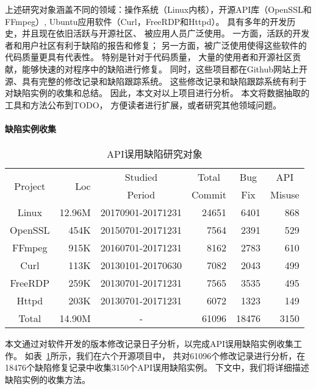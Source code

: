 上述研究对象涵盖不同的领域：操作系统（Linux内核），开源API库（OpenSSL和FFmpeg）,
Ubuntu应用软件（Curl，FreeRDP和Httpd）。
具有多年的开发历史，并且现在依旧活跃与开源社区、
被应用人员广泛使用。
一方面，活跃的开发者和用户社区有利于缺陷的报告和修复；
另一方面，被广泛使用使得这些软件的代码质量更具有代表性。
特别是针对于代码质量，
大量的使用者和开源社区贡献，能够快速的对程序中的缺陷进行修复。
同时，这些项目都在Github网站上开源、具有完整的修改记录和缺陷跟踪系统。
这些修改记录和缺陷跟踪系统有利于对缺陷实例的收集和总结。
因此，本文对以上项目进行分析。
本文将数据抽取的工具和方法公布到TODO，
方便读者进行扩展，或者研究其他领域问题。

\paragraph{缺陷实例收集}
\begin{table}[t]
	\centering
	\begin{minipage}[t]{0.9\linewidth} %
		\caption{API误用缺陷研究对象}
		\label{tab:2-3-statistics}
			\begin{tabular}{crcrrr}
			\hline
			\multirow{2}{*}{Project} & \multirow{2}{*}{Loc} & Studied & \multicolumn{1}{c}{Total}& \multicolumn{1}{c}{Bug}& \multicolumn{1}{c}{API}\\
			&  & Period & \multicolumn{1}{c}{Commit} & \multicolumn{1}{c}{Fix}& \multicolumn{1}{c}{Misuse} \\
			\hline
			Linux & 12.96M & 20170901-20171231 & 24651 & 6401 & 868 \\
			OpenSSL & 454K & 20150701-20171231 & 7564 & 2391 & 529 \\
			FFmpeg & 915K & 20160701-20171231 & 8162 & 2783 & 610 \\
			Curl & 113K & 20130101-20170630 & 7082 & 2043 & 499 \\
			FreeRDP & 259K & 20130701-20171231 & 7565 & 3535 & 495 \\
			Httpd & 203K & 20130701-20171231 & 6072 & 1323 & 149 \\
			\hline
			Total & 14.90M & - & 61096& 18476 & 3150 \\
			\hline
		\end{tabular}
	\end{minipage}
\end{table}



本文通过对软件开发的版本修改记录日子分析，以完成API误用缺陷实例收集工作。
如表~\ref{tab:2-3-statistics}所示，我们在六个开源项目中，
共对61096个修改记录进行分析，在18476个缺陷修复记录中收集3150个API误用缺陷实例。
下文中，我们将详细描述缺陷实例的收集方法。

